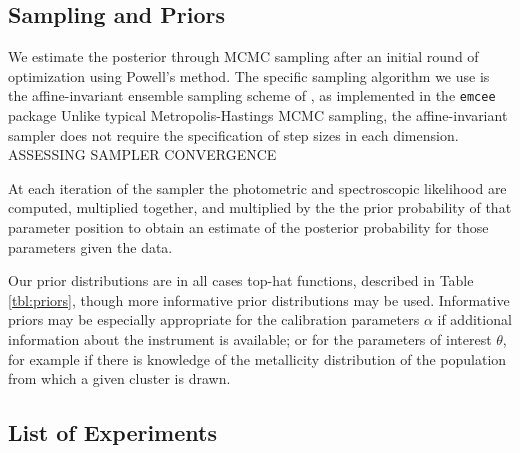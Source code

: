 \documentclass[iop,numberedappendix]{emulateapj}
\begin{document}
\subsection{Sampling and Priors}

We estimate the posterior through MCMC sampling after an initial round
of optimization using Powell's method.  The specific sampling
algorithm we use is the affine-invariant ensemble sampling scheme of
\citet{goodman}, as implemented in the \texttt{emcee} package \citep{emcee}
Unlike typical Metropolis-Hastings MCMC sampling, the affine-invariant
sampler does not require the specification of step sizes in each
dimension.  {\color{blue}ASSESSING SAMPLER CONVERGENCE}
 
At each iteration of the sampler the photometric and spectroscopic
likelihood are computed, multiplied together, and multiplied by the
the prior probability of that parameter position to obtain an estimate
of the posterior probability for those parameters given the data.

Our prior distributions are in all cases top-hat functions, described
in Table \ref{tbl:priors}, though more informative prior distributions
may be used.  Informative priors may be especially appropriate for the
calibration parameters $\alpha$ if additional information about the
instrument is available; or for the parameters of interest $\theta$,
for example if there is knowledge of the metallicity
distribution of the population from which a given cluster is drawn.




\subsection{List of Experiments}
\end{document}
